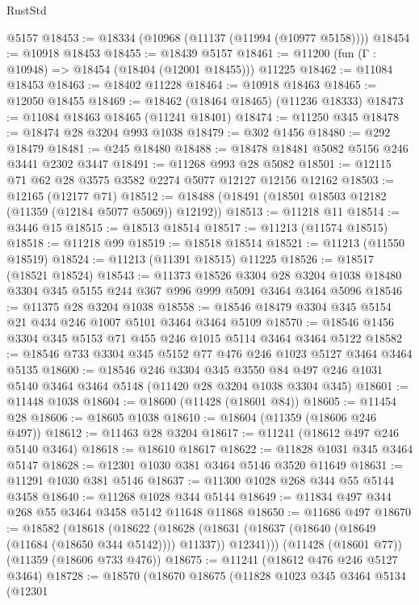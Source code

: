 \begin{lexlean}{RustStd}
\begin{coremodule}
{{{{{{{{{{{{{{{{{{{    @5157
@18453 := @18334 (@10968 (@11137 (@11994 (@10977 @5158))))
@18454 := @10918 @18453
@18455 := @18439 @5157
@18461 := @11200 (fun (Γ : @10948) => @18454 (@18404 (@12001 @18455))) @11225
@18462 := @11084 @18453
@18463 := @18402 @11228
@18464 := @10918 @18463
@18465 := @12050 @18455
@18469 := @18462 (@18464 @18465) (@11236 @18333)
@18473 := @11084 @18463 @18465 (@11241 @18401)
@18474 := @11250 @345
@18478 := @18474 @28 @3204 @993 @1038
@18479 := @302 @1456
@18480 := @292 @18479
@18481 := @245 @18480
@18488 := @18478 @18481 @5082 @5156 @246 @3441 @2302 @3447
@18491 := @11268 @993 @28 @5082
@18501 := @12115 @71 @62 @28 @3575 @3582 @2274 @5077 @12127 @12156 @12162
@18503 := @12165 (@12177 @71)
@18512 := @18488 (@18491 (@18501 @18503 @12182 (@11359 (@12184 @5077 @5069)) @12192))
@18513 := @11218 @11
@18514 := @3446 @15
@18515 := @18513 @18514
@18517 := @11213 (@11574 @18515)
@18518 := @11218 @99
@18519 := @18518 @18514
@18521 := @11213 (@11550 @18519)
@18524 := @11213 (@11391 @18515) @11225
@18526 := @18517 (@18521 @18524)
@18543 := @11373
    @18526
    @3304
    @28
    @3204
    @1038
    @18480
    @3304
    @345
    @5155
    @244
    @367
    @996
    @999
    @5091
    @3464
    @3464
    @5096
@18546 := @11375 @28 @3204 @1038
@18558 := @18546 @18479 @3304 @345 @5154 @21 @434 @246 @1007 @5101 @3464 @3464 @5109
@18570 := @18546 @1456 @3304 @345 @5153 @71 @455 @246 @1015 @5114 @3464 @3464 @5122
@18582 := @18546 @733 @3304 @345 @5152 @77 @476 @246 @1023 @5127 @3464 @3464 @5135
@18600 := @18546
    @246
    @3304
    @345
    @3550
    @84
    @497
    @246
    @1031
    @5140
    @3464
    @3464
    @5148
    (@11420 @28 @3204 @1038 @3304 @345)
@18601 := @11448 @1038
@18604 := @18600 (@11428 (@18601 @84))
@18605 := @11454 @28
@18606 := @18605 @1038
@18610 := @18604 (@11359 (@18606 @246 @497))
@18612 := @11463 @28 @3204
@18617 := @11241 (@18612 @497 @246 @5140 @3464)
@18618 := @18610 @18617
@18622 := @11828 @1031 @345 @3464 @5147
@18628 := @12301 @1030 @381 @3464 @5146 @3520 @11649
@18631 := @11291 @1030 @381 @5146
@18637 := @11300 @1028 @268 @344 @55 @5144 @3458
@18640 := @11268 @1028 @344 @5144
@18649 := @11834 @497 @344 @268 @55 @3464 @3458 @5142 @11648 @11868
@18650 := @11686 @497
@18670 := @18582
    (@18618
      (@18622
        (@18628 (@18631 (@18637 (@18640 (@18649 (@11684 (@18650 @344 @5142)))) @11337)) @12341)))
    (@11428 (@18601 @77))
    (@11359 (@18606 @733 @476))
@18675 := @11241 (@18612 @476 @246 @5127 @3464)
@18728 := @18570
    (@18670
      @18675
      (@11828
        @1023
        @345
        @3464
        @5134
        (@12301
}}}}}}}}}}}}}}}}}}}
\end{coremodule}
\end{lexlean}
